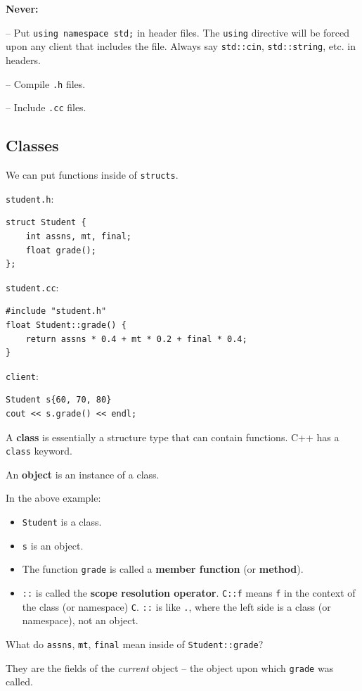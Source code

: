 \documentclass[11pt]{article}
\theoremstyle{definition}
\begin{document}
{\bf Never:} 

-- Put {\tt using namespace std;} in header files. The {\tt using} directive will be forced upon any client that includes the file. Always say {\tt std::cin}, {\tt std::string}, etc. in headers.

-- Compile {\tt .h} files.

-- Include {\tt .cc} files.

\subsection{Classes}
We can put functions inside of {\tt structs}.

{\tt student.h}:
\begin{lstlisting}
struct Student {
    int assns, mt, final;
    float grade();
};
\end{lstlisting}

{\tt student.cc}:
\begin{lstlisting}
#include "student.h"
float Student::grade() {
    return assns * 0.4 + mt * 0.2 + final * 0.4;
}
\end{lstlisting}

{\tt client}:
\begin{lstlisting}
Student s{60, 70, 80}
cout << s.grade() << endl;
\end{lstlisting}

A {\bf class} is essentially a structure type that can contain functions. C++ has a {\tt class} keyword. 

An {\bf object} is an instance of a class.

In the above example: \vspace{-0.25cm}
\begin{itemize}
\item {\tt Student} is a class.
\item {\tt s} is an object.
\item The function {\tt grade} is called a {\bf member function} (or {\bf method}).
\item {\tt ::} is called the {\bf scope resolution operator}. {\tt C::f} means {\tt f} in the context of the class (or namespace) {\tt C}. {\tt ::} is like {\tt .}, where the left side is a class (or namespace), not an object.
\end{itemize}
\vspace{-0.25cm}
What do {\tt assns}, {\tt mt}, {\tt final} mean inside of {\tt Student::grade}? 

They are the fields of the {\it current} object -- the object upon which {\tt grade} was called.
\end{document}
